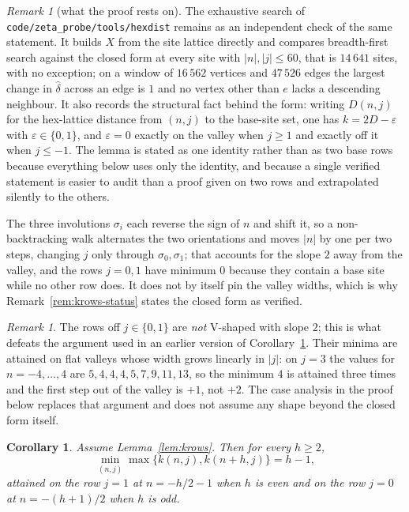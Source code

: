 \documentclass[11pt]{article}
\newtheorem{corollary}[theorem]{Corollary}
\theoremstyle{definition}
\theoremstyle{remark}
\newtheorem{remark}[theorem]{Remark}
\begin{document}
\begin{remark}[what the proof rests on]
The exhaustive search of \texttt{code/zeta\_probe/tools/hexdist} remains as an independent
check of the same statement. It builds $X$ from the site lattice directly and compares
breadth-first search against the closed form at every site with $|n|,|j|\le60$, that is
$14\,641$ sites, with no exception; on a window of $16\,562$ vertices and $47\,526$ edges the
largest change in $\widehat\delta$ across an edge is $1$ and no vertex other than $e$ lacks a
descending neighbour. It also records the structural fact behind the form: writing $D(n,j)$
for the hex-lattice distance from $(n,j)$ to the base-site set, one has $k=2D-\varepsilon$
with $\varepsilon\in\{0,1\}$, and $\varepsilon=0$ exactly on the valley when $j\ge1$ and
exactly off it when $j\le-1$. The lemma is stated as one identity rather than as two base rows
because everything below uses only the identity, and because a single verified statement is
easier to audit than a proof given on two rows and extrapolated silently to the others.
\end{remark}

The three involutions $\sigma_i$ each reverse the sign of $n$ and shift it, so a
non-backtracking walk alternates the two orientations and moves $|n|$ by one per two steps,
changing $j$ only through $\sigma_0,\sigma_1$; that accounts for the slope $2$ away from the
valley, and the rows $j=0,1$ have minimum $0$ because they contain a base site while no other
row does. It does not by itself pin the valley widths, which is why
Remark~\ref{rem:krows-status} states the closed form as verified.

\begin{remark}\label{rem:krows-shape}
The rows off $j\in\{0,1\}$ are \emph{not} V-shaped with slope $2$; this is what defeats the
argument used in an earlier version of Corollary~\ref{cor:antipair}. Their minima are attained
on flat valleys whose width grows linearly in $|j|$: on $j=3$ the values for $n=-4,\dots,4$
are $5,4,4,4,5,7,9,11,13$, so the minimum $4$ is attained three times and the first step out
of the valley is $+1$, not $+2$. The case analysis in the proof below replaces that argument
and does not assume any shape beyond the closed form itself.
\end{remark}

\begin{corollary}\label{cor:antipair}
Assume Lemma~\textup{\ref{lem:krows}}. Then for every $h\ge2$,
\[
   \min_{(n,j)}\max\{k(n,j),k(n+h,j)\}=h-1,
\]
attained on the row $j=1$ at $n=-h/2-1$ when $h$ is even and on the row $j=0$ at
$n=-(h+1)/2$ when $h$ is odd.
\end{corollary}
\end{document}
